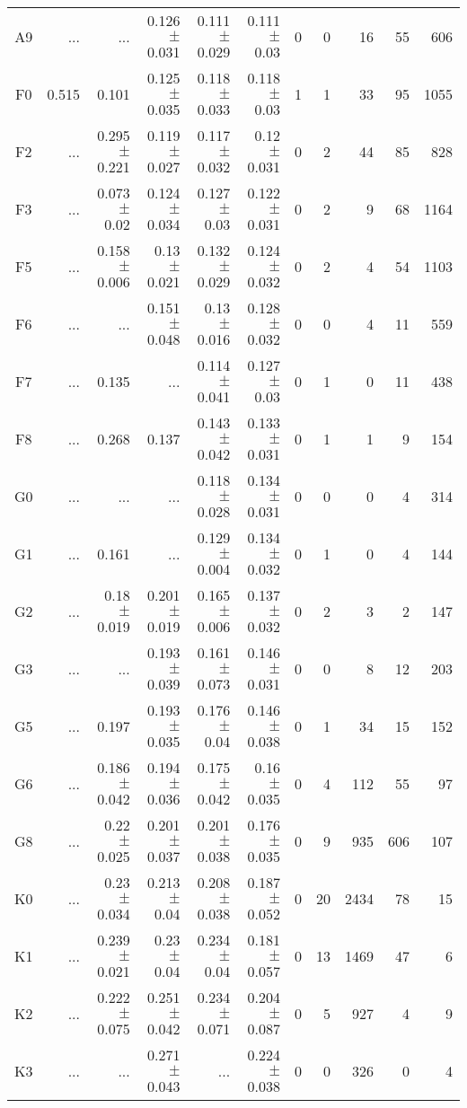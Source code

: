 \begin{table}[t]
\begin{table}[t]
\begin{center}
\begin{tabular}{c|rrrrr|rrrrr}
    A9	&	 ...	&	 ...	&	0.126$\pm$0.031	&	0.111$\pm$0.029	&	0.111$\pm$0.03	&	0	&	0	&	16	&	55	&	606	\\
    F0	&	0.515	&	0.101	&	0.125$\pm$0.035	&	0.118$\pm$0.033	&	0.118$\pm$0.03	&	1	&	1	&	33	&	95	&	1055	\\
    F2	&	 ...	&	0.295$\pm$0.221	&	0.119$\pm$0.027	&	0.117$\pm$0.032	&	0.12$\pm$0.031	&	0	&	2	&	44	&	85	&	828	\\
    F3	&	 ...	&	0.073$\pm$0.02	&	0.124$\pm$0.034	&	0.127$\pm$0.03	&	0.122$\pm$0.031	&	0	&	2	&	9	&	68	&	1164	\\
    F5	&	 ...	&	0.158$\pm$0.006	&	0.13$\pm$0.021	&	0.132$\pm$0.029	&	0.124$\pm$0.032	&	0	&	2	&	4	&	54	&	1103	\\
    F6	&	 ...	&	 ...	&	0.151$\pm$0.048	&	0.13$\pm$0.016	&	0.128$\pm$0.032	&	0	&	0	&	4	&	11	&	559	\\
    F7	&	 ...	&	0.135	&	 ...	&	0.114$\pm$0.041	&	0.127$\pm$0.03	&	0	&	1	&	0	&	11	&	438	\\
    F8	&	 ...	&	0.268	&	0.137	&	0.143$\pm$0.042	&	0.133$\pm$0.031	&	0	&	1	&	1	&	9	&	154	\\
    G0	&	 ...	&	 ...	&	 ...	&	0.118$\pm$0.028	&	0.134$\pm$0.031	&	0	&	0	&	0	&	4	&	314	\\
    G1	&	 ...	&	0.161	&	 ...	&	0.129$\pm$0.004	&	0.134$\pm$0.032	&	0	&	1	&	0	&	4	&	144	\\
    G2	&	 ...	&	0.18$\pm$0.019	&	0.201$\pm$0.019	&	0.165$\pm$0.006	&	0.137$\pm$0.032	&	0	&	2	&	3	&	2	&	147	\\
    G3	&	 ...	&	 ...	&	0.193$\pm$0.039	&	0.161$\pm$0.073	&	0.146$\pm$0.031	&	0	&	0	&	8	&	12	&	203	\\
    G5	&	 ...	&	0.197	&	0.193$\pm$0.035	&	0.176$\pm$0.04	&	0.146$\pm$0.038	&	0	&	1	&	34	&	15	&	152	\\
    G6	&	 ...	&	0.186$\pm$0.042	&	0.194$\pm$0.036	&	0.175$\pm$0.042	&	0.16$\pm$0.035	&	0	&	4	&	112	&	55	&	97	\\
    G8	&	 ...	&	0.22$\pm$0.025	&	0.201$\pm$0.037	&	0.201$\pm$0.038	&	0.176$\pm$0.035	&	0	&	9	&	935	&	606	&	107	\\
    K0	&	 ...	&	0.23$\pm$0.034	&	0.213$\pm$0.04	&	0.208$\pm$0.038	&	0.187$\pm$0.052	&	0	&	20	&	2434	&	78	&	15	\\
    K1	&	 ...	&	0.239$\pm$0.021	&	0.23$\pm$0.04	&	0.234$\pm$0.04	&	0.181$\pm$0.057	&	0	&	13	&	1469	&	47	&	6	\\
    K2	&	 ...	&	0.222$\pm$0.075	&	0.251$\pm$0.042	&	0.234$\pm$0.071	&	0.204$\pm$0.087	&	0	&	5	&	927	&	4	&	9	\\
    K3	&	 ...	&	 ...	&	0.271$\pm$0.043	&	 ...	&	0.224$\pm$0.038	&	0	&	0	&	326	&	0	&	4	\\

\end{tabular}
\end{center}
\end{table}
\end{table}
